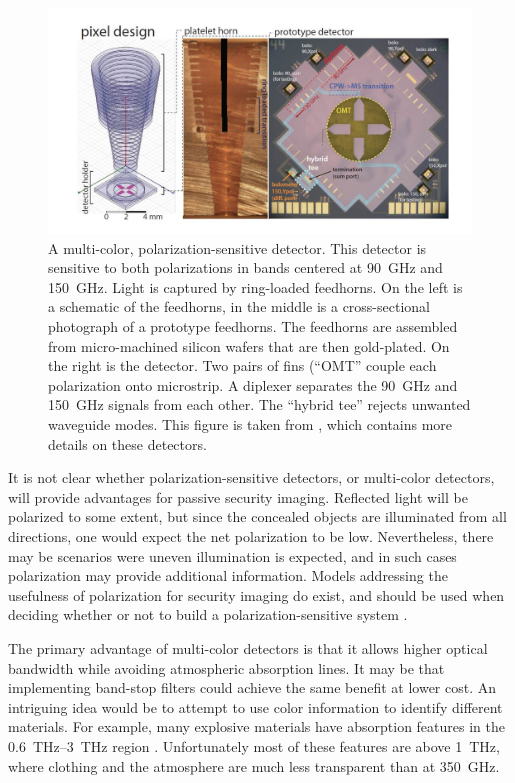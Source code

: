 \begin{figure}
\centering
\includegraphics[width=\textwidth]{images/ch9-multi-chroic.jpg}
\caption[Multi-color, polarization-sensitive detectors]{
  A multi-color, polarization-sensitive detector.
  This detector is sensitive to both polarizations in bands centered at \SI{90}{\GHz} and \SI{150}{\GHz}.
  Light is captured by ring-loaded feedhorns.
  On the left is a schematic of the feedhorns, in the middle is a cross-sectional photograph of a prototype feedhorns.
  The feedhorns are assembled from micro-machined silicon wafers that are then gold-plated.
  On the right is the detector.
  Two pairs of fins (``OMT'' couple each polarization onto microstrip.
  A diplexer separates the \SI{90}{\GHz} and \SI{150}{\GHz} signals from each other.
  The ``hybrid tee'' rejects unwanted waveguide modes.
  This figure is taken from \cite{datta_horn_2014}, which contains more details on these detectors.
}
\label{fig:ch9-multi-chroic}
\end{figure}

It is not clear whether polarization-sensitive detectors, or multi-color detectors, will provide advantages for passive security imaging.
Reflected light will be polarized to some extent, but since the concealed objects are illuminated from all directions, one would expect the net polarization to be low.
Nevertheless, there may be scenarios were uneven illumination is expected, and in such cases polarization may provide additional information.
Models addressing the usefulness of polarization for security imaging do exist, and should be used when deciding whether or not to build a polarization-sensitive system \cite{salmon_polarimetric_2004}.

The primary advantage of multi-color detectors is that it allows higher optical bandwidth while avoiding atmospheric absorption lines.
It may be that implementing band-stop filters could achieve the same benefit at lower cost.
An intriguing idea would be to attempt to use color information to identify different materials.
For example, many explosive materials have absorption features in the \SIrange{0.6}{3}{\THz} region \cite{federici_thz_2005,davies_terahertz_2008}.
Unfortunately most of these features are above \SI{1}{\THz}, where clothing and the atmosphere are much less transparent than at \SI{350}{\GHz}.

